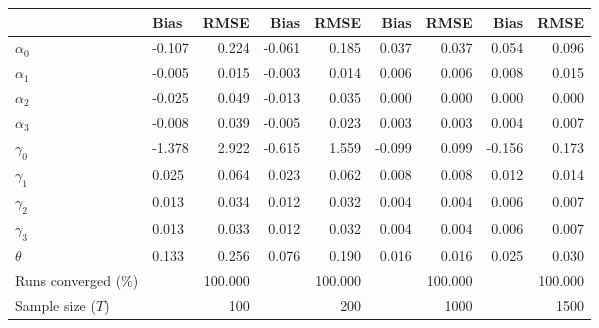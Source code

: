 
\begin{tabular}[t]{llrrrrrrr}
\toprule
  & Bias & RMSE & Bias & RMSE & Bias & RMSE & Bias & RMSE\\
\midrule
$\alpha_{0}$ & -0.107 & 0.224 & -0.061 & 0.185 & 0.037 & 0.037 & 0.054 & 0.096\\
$\alpha_{1}$ & -0.005 & 0.015 & -0.003 & 0.014 & 0.006 & 0.006 & 0.008 & 0.015\\
$\alpha_{2}$ & -0.025 & 0.049 & -0.013 & 0.035 & 0.000 & 0.000 & 0.000 & 0.000\\
$\alpha_{3}$ & -0.008 & 0.039 & -0.005 & 0.023 & 0.003 & 0.003 & 0.004 & 0.007\\
$\gamma_{0}$ & -1.378 & 2.922 & -0.615 & 1.559 & -0.099 & 0.099 & -0.156 & 0.173\\
$\gamma_{1}$ & 0.025 & 0.064 & 0.023 & 0.062 & 0.008 & 0.008 & 0.012 & 0.014\\
$\gamma_{2}$ & 0.013 & 0.034 & 0.012 & 0.032 & 0.004 & 0.004 & 0.006 & 0.007\\
$\gamma_{3}$ & 0.013 & 0.033 & 0.012 & 0.032 & 0.004 & 0.004 & 0.006 & 0.007\\
$\theta$ & 0.133 & 0.256 & 0.076 & 0.190 & 0.016 & 0.016 & 0.025 & 0.030\\
Runs converged (\%) &  & 100.000 &  & 100.000 &  & 100.000 &  & 100.000\\
Sample size ($T$) &  & 100 &  & 200 &  & 1000 &  & 1500\\
\bottomrule
\end{tabular}
